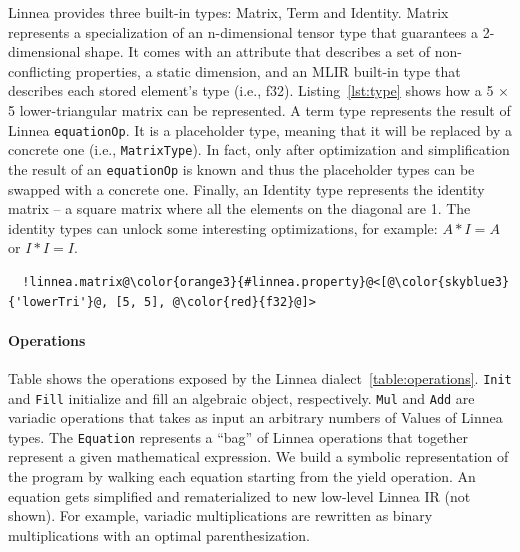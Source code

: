 \documentclass[conference]{IEEEtran}
\begin{document}
Linnea provides three built-in types: Matrix, Term and Identity. Matrix
represents a specialization of an n-dimensional tensor type that guarantees a
2-dimensional shape. It comes with an attribute that describes a set of
non-conflicting properties, a static dimension, and an MLIR built-in type that
describes each stored element's type (i.e., f32). Listing~\ref{lst:type} shows
how a 5 $\times$ 5 lower-triangular matrix can be represented. A term type
represents the result of Linnea \texttt{equationOp}. It is a placeholder type,
meaning that it will be replaced by a concrete one (i.e., \texttt{MatrixType}).
In fact, only after optimization and simplification the result of an
\texttt{equationOp} is known and thus the placeholder types can be swapped with
a concrete one. Finally, an Identity type represents the identity matrix -- a
square matrix where all the elements on the diagonal are 1. The identity types
can unlock some interesting optimizations, for example: $A * I = A$ or $I * I =
I$.

\begin{listing}[]
\begin{center}
\begin{minipage}[]{0.5\textwidth}
\begin{verbatim}
  !linnea.matrix@\color{orange3}{#linnea.property}@<[@\color{skyblue3}{'lowerTri'}@, [5, 5], @\color{red}{f32}@]>
\end{verbatim}
\end{minipage}
  \caption{A type to represent a 5 $\times$ 5 lower-triangular matrix with \texttt{f32} as element type.}
\label{lst:type}
\end{center}
\end{listing}

\paragraph{Operations}

Table shows the operations exposed by the Linnea
dialect~\ref{table:operations}. \texttt{Init} and \texttt{Fill} initialize and
fill an algebraic object, respectively. \texttt{Mul} and \texttt{Add} are
variadic operations that takes as input an arbitrary numbers of Values of
Linnea types.  The \texttt{Equation} represents a ``bag'' of Linnea operations
that together represent a given mathematical expression. We build a symbolic
representation of the program by walking each equation starting from the yield
operation. An equation gets simplified and rematerialized to new low-level
Linnea IR (not shown).  For example, variadic multiplications are  rewritten as binary
multiplications with an optimal parenthesization. 
\end{document}
